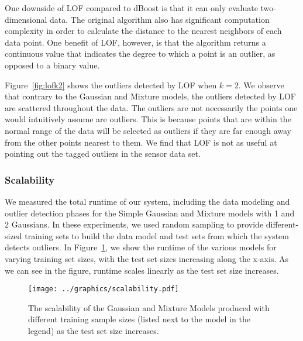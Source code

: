 One downside of LOF compared to dBoost is that it can only evaluate two-dimensional data.
The original algorithm also has significant computation complexity in order to calculate the distance to the nearest neighbors of each data point.
One benefit of LOF, however, is that the algorithm returns a continuous value that indicates the degree to which a point is an outlier, as opposed to a binary value.

Figure~\ref{fig:lofk2} shows the outliers detected by LOF when $k=2$.
We observe that contrary to the Gaussian and Mixture models, the outliers detected by LOF are scattered throughout the data.
The outliers are not necessarily the points one would intuitively assume are outliers.
This is because points that are within the normal range of the data will be selected as outliers if they are far enough away from the other points nearest to them.
We find that LOF is not as useful at pointing out the tagged outliers in the sensor data set.

\subsubsection{Scalability}

We measured the total runtime of our system, including the data modeling and outlier detection phases for the Simple Gaussian and Mixture models with 1 and 2 Gaussians.
In these experiments, we used random sampling to provide different-sized training sets to build the data model and test sets from which the system detects outliers.
In Figure~\ref{fig:scaling}, we show the runtime of the various models for varying training set sizes, with the test set sizes increasing along the x-axis.
As we can see in the figure, runtime scales linearly as the test set size increases.

\begin{figure}
\centering
\texttt{[image: ../graphics/scalability.pdf]}
\caption{The scalability of the Gaussian and Mixture Models produced with different training sample sizes (listed next to the model in the legend) as the test set size increases.}
\label{fig:scaling}
\end{figure}
